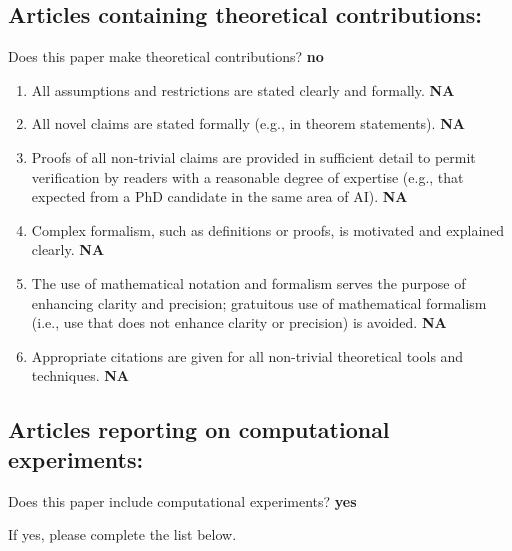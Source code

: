 \documentclass[manuscript, screen, review]{jair}
\begin{document}
\subsection*{Articles containing theoretical contributions:}
Does this paper make theoretical contributions?
\textbf{no}

\begin{enumerate}
    \item All assumptions and restrictions are stated clearly and formally.
    \textbf{NA}
    \item All novel claims are stated formally (e.g., in theorem statements).
    \textbf{NA}
    \item Proofs of all non-trivial claims are provided in sufficient detail to permit verification by readers with a reasonable degree of expertise (e.g., that expected from a PhD candidate in the same area of AI). \textbf{NA}
    \item
    Complex formalism, such as definitions or proofs, is motivated and explained clearly.
    \textbf{NA}
    \item
    The use of mathematical notation and formalism serves the purpose of enhancing clarity and precision; gratuitous use of mathematical formalism (i.e., use that does not enhance clarity or precision) is avoided.
    \textbf{NA}
    \item
    Appropriate citations are given for all non-trivial theoretical tools and techniques.
    \textbf{NA}
\end{enumerate}

\subsection*{Articles reporting on computational experiments:}
Does this paper include computational experiments? \textbf{yes}

If yes, please complete the list below.
\end{document}
